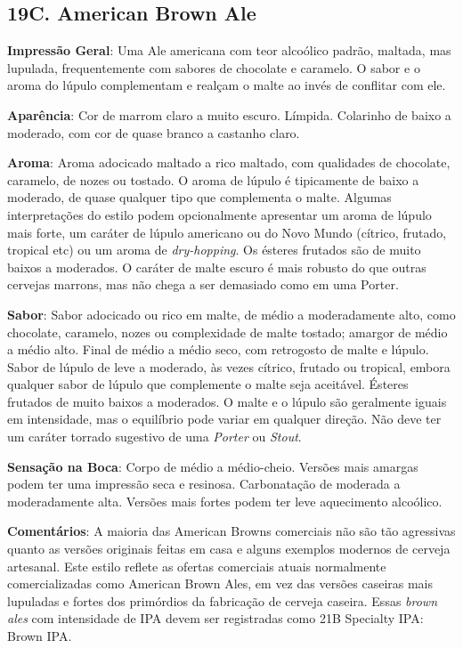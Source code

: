 \subsection*{19C. American Brown Ale}

\textbf{Impressão Geral}: Uma Ale americana com teor alcoólico padrão, maltada, mas lupulada, frequentemente com sabores de chocolate e caramelo. O sabor e o aroma do lúpulo complementam e realçam o malte ao invés de conflitar com ele.

\textbf{Aparência}: Cor de marrom claro a muito escuro. Límpida. Colarinho de baixo a moderado, com cor de quase branco a castanho claro.

\textbf{Aroma}: Aroma adocicado maltado a rico maltado, com qualidades de chocolate, caramelo, de nozes ou tostado. O aroma de lúpulo é tipicamente de baixo a moderado, de quase qualquer tipo que complementa o malte. Algumas interpretações do estilo podem opcionalmente apresentar um aroma de lúpulo mais forte, um caráter de lúpulo americano ou do Novo Mundo (cítrico, frutado, tropical etc) ou um aroma de \textit{dry-hopping}. Os ésteres frutados são de muito baixos a moderados. O caráter de malte escuro é mais robusto do que outras cervejas marrons, mas não chega a ser demasiado como em uma Porter.

\textbf{Sabor}: Sabor adocicado ou rico em malte, de médio a moderadamente alto, como chocolate, caramelo, nozes ou complexidade de malte tostado; amargor de médio a médio alto. Final de médio a médio seco, com retrogosto de malte e lúpulo. Sabor de lúpulo de leve a moderado, às vezes cítrico, frutado ou tropical, embora qualquer sabor de lúpulo que complemente o malte seja aceitável. Ésteres frutados de muito baixos a moderados. O malte e o lúpulo são geralmente iguais em intensidade, mas o equilíbrio pode variar em qualquer direção. Não deve ter um caráter torrado sugestivo de uma \textit{Porter} ou \textit{Stout}.

\textbf{Sensação na Boca}: Corpo de médio a médio-cheio. Versões mais amargas podem ter uma impressão seca e resinosa. Carbonatação de moderada a moderadamente alta. Versões mais fortes podem ter leve aquecimento alcoólico.

\textbf{Comentários}: A maioria das American Browns comerciais não são tão agressivas quanto as versões originais feitas em casa e alguns exemplos modernos de cerveja artesanal. Este estilo reflete as ofertas comerciais atuais normalmente comercializadas como American Brown Ales, em vez das versões caseiras mais lupuladas e fortes dos primórdios da fabricação de cerveja caseira. Essas \textit{brown ales} com intensidade de IPA devem ser registradas como 21B Specialty IPA: Brown IPA.

